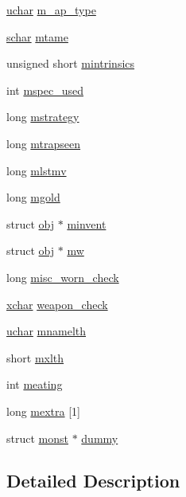 \begin{DoxyCompactItemize}
\hyperlink{config_8h_a65f85814a8290f9797005d3b28e7e5fc}{uchar} \hyperlink{structmonst_aab8fc9a0be90b4db8333b09487e2620c}{m\+\_\+ap\+\_\+type}
\item 
\hyperlink{config_8h_a0fd9ce9d735064461bebfe6037026093}{schar} \hyperlink{structmonst_a6d525ec48f9d38cda6accbb0cb39efba}{mtame}
\item 
unsigned short \hyperlink{structmonst_a75e177403095d3c7ce5636d6d20ed725}{mintrinsics}
\item 
int \hyperlink{structmonst_aa3eed6a8c61ab12cb5ae5d1255d3e2eb}{mspec\+\_\+used}
\item 
long \hyperlink{structmonst_a5d03af85e4563c4068ac07d616af859f}{mstrategy}
\item 
long \hyperlink{structmonst_a792271938bf793d0b6cfef02171f967a}{mtrapseen}
\item 
long \hyperlink{structmonst_a942c3eb47c3057fe67733f1a7be5e63b}{mlstmv}
\item 
long \hyperlink{structmonst_a06dbdd0ca7ee096216aa10f86beed533}{mgold}
\item 
struct \hyperlink{structobj}{obj} $\ast$ \hyperlink{structmonst_a480856d6a5db5610593c9816e525a978}{minvent}
\item 
struct \hyperlink{structobj}{obj} $\ast$ \hyperlink{structmonst_a7f9a7c88f9e21d79368123c0a72af0d5}{mw}
\item 
long \hyperlink{structmonst_afc2bd39e2f3e797e15bea20ac7f69788}{misc\+\_\+worn\+\_\+check}
\item 
\hyperlink{global_8h_a2043b7d01ce89f4ee2fa6c345a752d32}{xchar} \hyperlink{structmonst_a78c189917d1c1a53b6ac4fa2fb65611a}{weapon\+\_\+check}
\item 
\hyperlink{config_8h_a65f85814a8290f9797005d3b28e7e5fc}{uchar} \hyperlink{structmonst_a03fe7192ae1efd428bc9a0d2f856125f}{mnamelth}
\item 
short \hyperlink{structmonst_a6c24439d98c9580ee2a3918008801ac2}{mxlth}
\item 
int \hyperlink{structmonst_ac6633f5d2ad6b74ec498541f3a3fe38b}{meating}
\item 
long \hyperlink{structmonst_a3fea4dd3adc3f4921e8b68a1f31326dd}{mextra} \mbox{[}1\mbox{]}
\item 
struct \hyperlink{structmonst}{monst} $\ast$ \hyperlink{structmonst_a10134cb1897b4ccd2d51aba7bae60c50}{dummy}
\end{DoxyCompactItemize}


\subsection{Detailed Description}


